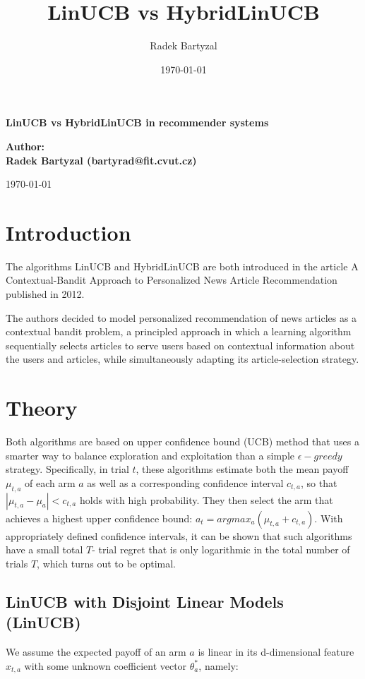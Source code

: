 \documentclass[12pt, titlepage]{article}
\title{LinUCB vs HybridLinUCB}
\date{\today}
\author{Radek Bartyzal}
\begin{document}
\begin{titlepage}
    \centering
    \vfill
    {\bfseries\Huge
        LinUCB vs HybridLinUCB in recommender systems
    }    
    \vfill
        
    
        
    {\bfseries\Large 
    Author:\\
    Radek Bartyzal (bartyrad@fit.cvut.cz)\\
    }    
    \vskip1cm
 
    \vskip1cm
    \today

    
    \vfill
\end{titlepage}

\pagebreak

\section{Introduction}\label{sec:intro}
The algorithms LinUCB and HybridLinUCB are both introduced in the article A Contextual-Bandit Approach to
Personalized News Article Recommendation published in 2012.

The authors decided to model personalized recommendation of news
articles as a contextual bandit problem, a principled approach in
which a learning algorithm sequentially selects articles to serve
users based on contextual information about the users and articles,
while simultaneously adapting its article-selection strategy.

\section{Theory}\label{sec:theory}
Both algorithms are based on upper confidence bound (UCB) method that uses a smarter way to balance
exploration and exploitation than a simple $\epsilon-greedy$ strategy. 
Specifically, in trial $t$, these algorithms
estimate both the mean payoff $\mu_{t,a}$ of each arm $a$ as well
as a corresponding confidence interval $c_{t,a}$, so that $|\mu_{t,a} - \mu_a| <
c_{t,a}$ holds with high probability. They then select the arm that
achieves a highest upper confidence bound: $a_t =
arg max_a (\mu_{t,a} + c_{t,a})$. With appropriately defined confidence intervals,
it can be shown that such algorithms have a small total $T$-
trial regret that is only logarithmic in the total number of trials $T$,
which turns out to be optimal. 

\subsection{LinUCB with Disjoint Linear Models (LinUCB)}
We assume the expected payoff of an arm $a$ is linear in its d-dimensional feature $x_{t,a}$ with some unknown coefficient vector $\theta^*_a$, namely:
\end{document}
